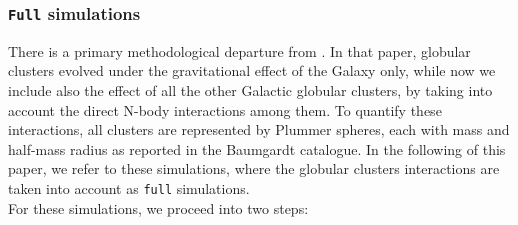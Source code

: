 \documentclass[draft]{aa}
\begin{document}
    \subsubsection*{ \texttt{Full} simulations}
    There is a primary methodological departure from \citet{2023A&A...673A..44F}.  In that paper, globular clusters evolved under the gravitational effect of the Galaxy only, while now we include also the effect of all the other Galactic globular clusters, by taking into account the direct N-body interactions among them. To quantify these interactions, all clusters are represented by Plummer spheres, each with mass and half-mass radius as reported in the Baumgardt catalogue. In the following of this paper, we refer to these simulations, where the globular clusters interactions are taken into account as \texttt{full} simulations. \\
    For these simulations, we proceed into two steps:
\end{document}

